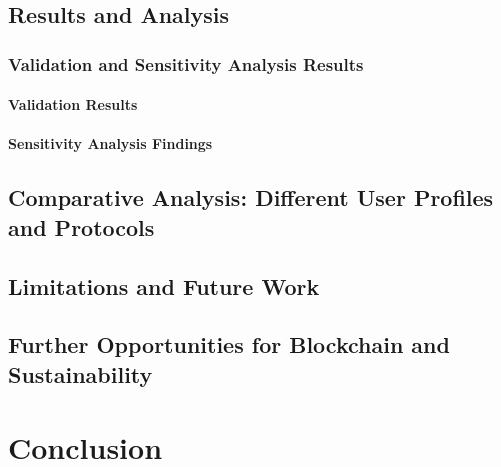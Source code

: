 \documentclass[11pt]{report}
\begin{document}
\section{Results and Analysis}
\subsection{Validation and Sensitivity Analysis Results}
\subsubsection{Validation Results}
\subsubsection{Sensitivity Analysis Findings}
\section{Comparative Analysis: Different User Profiles and Protocols}
\section{Limitations and Future Work}
\section{Further Opportunities for Blockchain and Sustainability}

\chapter{Conclusion}



\end{document}
